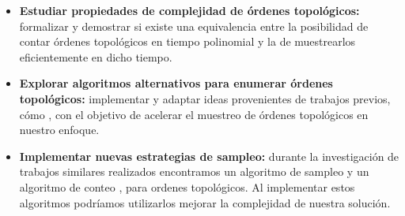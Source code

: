 \begin{itemize}
  \item \textbf{Estudiar propiedades de complejidad de órdenes topológicos:} formalizar y demostrar si existe una equivalencia entre la posibilidad de contar órdenes topológicos en tiempo polinomial y la de muestrearlos eficientemente en dicho tiempo.

  \item \textbf{Explorar algoritmos alternativos para enumerar órdenes topológicos:} implementar y adaptar ideas provenientes de trabajos previos, cómo \cite{efficientToposort}, con el objetivo de acelerar el muestreo de órdenes topológicos en nuestro enfoque.

  \item \textbf{Implementar nuevas estrategias de sampleo:} durante la investigación de trabajos similares realizados encontramos un algoritmo de sampleo \cite{HUBER2006420} y un algoritmo de conteo \cite{efficientCountingOfToposorts}, para ordenes topológicos. Al implementar estos algoritmos podríamos utilizarlos mejorar la complejidad de nuestra solución. 
\end{itemize}

